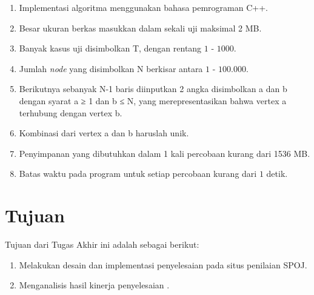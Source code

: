 \begin{enumerate}
	\item Implementasi algoritma menggunakan bahasa pemrograman C++.
	\item Besar ukuran berkas masukkan dalam sekali uji maksimal 2 MB.
	\item Banyak kasus uji disimbolkan T, dengan rentang $ 1 $ - $ 1000 $.
	\item Jumlah \textit{node} yang disimbolkan N berkisar antara $ 1 $ - $ 100.000 $.
	\item Berikutnya sebanyak N-1 baris diinputkan 2 angka disimbolkan a dan b dengan syarat a ≥ 1 dan b ≤ N, yang merepresentasikan bahwa vertex a terhubung dengan vertex b.
	\item Kombinasi dari vertex a dan b haruslah unik.
	\item Penyimpanan yang dibutuhkan dalam 1 kali percobaan kurang dari 1536 MB.
	\item Batas waktu pada program untuk setiap percobaan kurang dari $ 1 $ detik.

\end{enumerate}

\section{\quad Tujuan}
\quad Tujuan dari Tugas Akhir ini adalah sebagai berikut:
\begin{enumerate}
	\item Melakukan desain dan implementasi penyelesaian \problem\cite{listree} pada situs penilaian SPOJ.
	\item Menganalisis hasil kinerja penyelesaian \problem\cite{listree}.
\end{enumerate}

